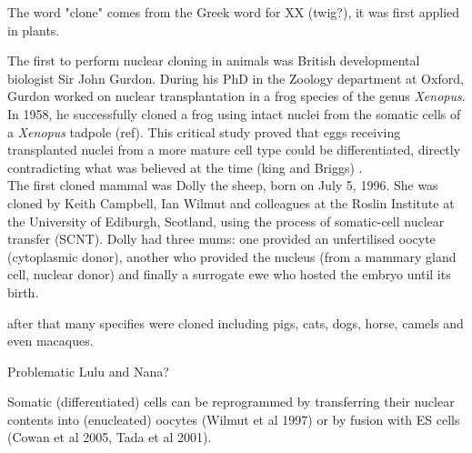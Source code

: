 The word "clone" comes from the Greek word for XX (twig?), it was first applied in plants.

The first to perform nuclear cloning in animals was British developmental biologist Sir John Gurdon. 
During his PhD in the Zoology department at Oxford, Gurdon worked on nuclear transplantation in a frog species of the genus \textit{Xenopus}.
In 1958, he successfully cloned a frog using intact nuclei from the somatic cells of a \textit{Xenopus} tadpole (ref).
This critical study proved that eggs receiving transplanted nuclei from a more mature cell type could be differentiated, directly contradicting what was believed at the time (king and Briggs) \cite{king1955changes}. \\

The first cloned mammal was Dolly the sheep, born on July 5, 1996.
She was cloned by Keith Campbell, Ian Wilmut and colleagues at the Roslin Institute at the University of Ediburgh, Scotland, using the process of somatic-cell nuclear transfer (SCNT).
Dolly had three mums: one provided an unfertilised oocyte (cytoplasmic donor), another who provided the nucleus (from a mammary gland cell, nuclear donor) and finally a surrogate ewe who hosted the embryo until its birth.

after that many specifies were cloned including pigs, cats, dogs, horse, camels and even macaques.

Problematic Lulu and Nana?



Somatic (differentiated) cells can be reprogrammed by transferring their nuclear contents into (enucleated) oocytes (Wilmut et al 1997) or by fusion with ES cells (Cowan et al 2005, Tada et al 2001).

